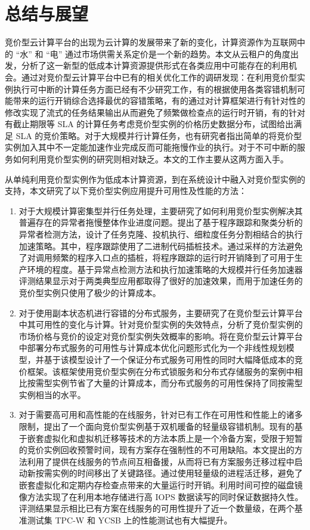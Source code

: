 \chapter{总结与展望}
\label{cha:conclusion_futruework}
竞价型云计算平台的出现为云计算的发展带来了新的变化，计算资源作为互联网中的 ``水'' 和 ``电'' 通过市场供需关系定价是一个新的趋势。本文从云租户的角度出发，分析了这一新型的低成本计算资源提供形式在各类应用中可能存在的利用机会。通过对竞价型云计算平台中已有的相关优化工作的调研发现：在利用竞价型实例执行可中断的计算任务方面已经有不少研究工作，有的根据使用各类容错机制可能带来的运行开销综合选择最优的容错策略，有的通过对计算框架进行有针对性的修改实现了流式的任务结果输出从而避免了频繁做检查点的运行时开销，有的针对有截止期限等 SLA 的计算任务考虑竞价型实例的价格历史数据分布，试图给出满足 SLA 的竞价策略。对于大规模并行计算任务，也有研究者指出简单的将竞价型实例加入其中不一定能加速作业完成反而可能拖慢作业的执行。对于不可中断的服务如何利用竞价型实例的研究则相对缺乏。本文的工作主要从这两方面入手。

从单纯利用竞价型实例作为低成本计算资源，到在系统设计中融入对竞价型实例的支持，本文研究了以下竞价型实例应用提升可用性及性能的方法：
\begin{enumerate}
\item 对于大规模计算密集型并行任务处理，主要研究了如何利用竞价型实例解决其普遍存在的异常者拖慢整体作业进度问题。提出了基于程序跟踪和聚类分析的异常者检测方法，设计了任务克隆、投机执行、细粒度任务分割相结合的执行加速策略。其中，程序跟踪使用了二进制代码插桩技术。通过采样的方法避免了对调用频繁的程序入口点的插桩，将程序跟踪的运行时开销降到了可用于生产环境的程度。基于异常点检测方法和执行加速策略的大规模并行任务加速器评测结果显示对于两类典型应用都取得了很好的加速效果，而用于加速任务的竞价型实例只使用了极少的计算成本。
\item 对于使用副本状态机进行容错的分布式服务，主要研究了在竞价型云计算平台中其可用性的变化与计算。针对竞价型实例的失效特点，分析了竞价型实例的市场价格与竞价的设定对竞价型实例失效概率的影响。将在竞价型云计算平台中部署分布式服务的可用性与计算成本优化问题形式化为一个非线性规划模型，并基于该模型设计了一个保证分布式服务可用性的同时大幅降低成本的竞价框架。该框架使用竞价型实例在分布式锁服务和分布式存储服务的案例中相比按需型实例节省了大量的计算成本，而分布式服务的可用性保持了同按需型实例相当的水平。
\item 对于需要高可用和高性能的在线服务，针对已有工作在可用性和性能上的诸多限制，提出了一个面向竞价型实例基于双机暖备的轻量级容错机制。现有的基于嵌套虚拟化和虚拟机迁移等技术的方法本质上是一个冷备方案，受限于短暂的竞价实例回收预警时间，现有方案存在强制性的不可用缺陷。本文提出的方法利用了提供在线服务的节点间互相备援，从而将已有方案服务迁移过程中启动新按需实例的时间移出了关键路径。通过使用轻量级的进程活迁移，避免了嵌套虚拟化和定期内存检查点带来的大量运行时开销。利用时间可控的磁盘镜像方法实现了在利用本地存储进行高 IOPS 数据读写的同时保证数据持久性。评测结果显示相比已有方案在线服务的可用性提升了近一个数量级，在两个基准测试集 TPC-W 和 YCSB 上的性能测试也有大幅提升。
\end{enumerate}

